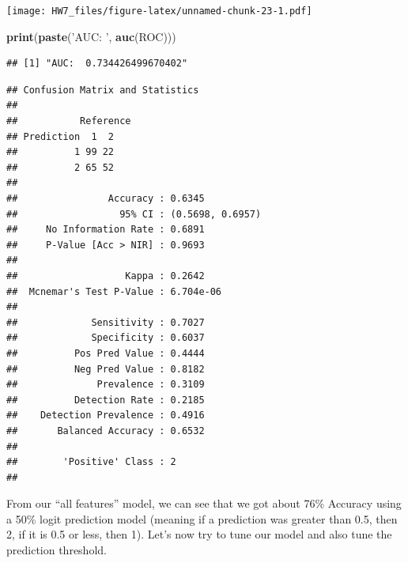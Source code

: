 \documentclass[]{article}
\newenvironment{Shaded}{\begin{snugshade}}{\end{snugshade}}
\newcommand{\KeywordTok}[1]{\textcolor[rgb]{0.13,0.29,0.53}{\textbf{#1}}}
\newcommand{\DataTypeTok}[1]{\textcolor[rgb]{0.13,0.29,0.53}{#1}}
\newcommand{\DecValTok}[1]{\textcolor[rgb]{0.00,0.00,0.81}{#1}}
\newcommand{\FloatTok}[1]{\textcolor[rgb]{0.00,0.00,0.81}{#1}}
\newcommand{\StringTok}[1]{\textcolor[rgb]{0.31,0.60,0.02}{#1}}
\newcommand{\OperatorTok}[1]{\textcolor[rgb]{0.81,0.36,0.00}{\textbf{#1}}}
\newcommand{\NormalTok}[1]{#1}
\begin{document}
\texttt{[image: HW7\_files/figure-latex/unnamed-chunk-23-1.pdf]}

\begin{Shaded}
\begin{Highlighting}[]
\KeywordTok{print}\NormalTok{(}\KeywordTok{paste}\NormalTok{(}\StringTok{'AUC: '}\NormalTok{, }\KeywordTok{auc}\NormalTok{(ROC)))}
\end{Highlighting}
\end{Shaded}

\begin{verbatim}
## [1] "AUC:  0.734426499670402"
\end{verbatim}

\begin{Shaded}
\end{Shaded}

\begin{verbatim}
## Confusion Matrix and Statistics
## 
##           Reference
## Prediction  1  2
##          1 99 22
##          2 65 52
##                                           
##                Accuracy : 0.6345          
##                  95% CI : (0.5698, 0.6957)
##     No Information Rate : 0.6891          
##     P-Value [Acc > NIR] : 0.9693          
##                                           
##                   Kappa : 0.2642          
##  Mcnemar's Test P-Value : 6.704e-06       
##                                           
##             Sensitivity : 0.7027          
##             Specificity : 0.6037          
##          Pos Pred Value : 0.4444          
##          Neg Pred Value : 0.8182          
##              Prevalence : 0.3109          
##          Detection Rate : 0.2185          
##    Detection Prevalence : 0.4916          
##       Balanced Accuracy : 0.6532          
##                                           
##        'Positive' Class : 2               
## 
\end{verbatim}

From our ``all features'' model, we can see that we got about 76\%
Accuracy using a 50\% logit prediction model (meaning if a prediction
was greater than 0.5, then 2, if it is 0.5 or less, then 1). Let's now
try to tune our model and also tune the prediction threshold.
\end{document}
